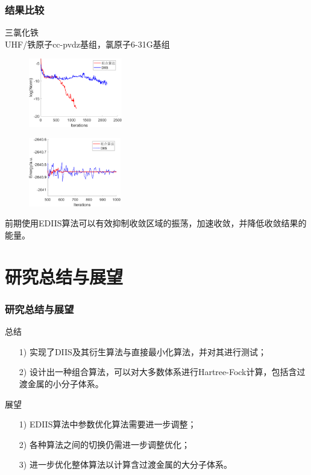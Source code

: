 \documentclass[10pt,aspectratio=43,mathserif,UTF8]{beamer}
\begin{document}
\begin{frame}
	\frametitle{结果比较}
	三氯化铁\\
	UHF/铁原子cc-pvdz基组，氯原子6-31G基组

	\begin{figure}[ht!]
		\centering
		\begin{minipage}{0.4\linewidth}
			\centering
			\includegraphics[height=3cm]{figure/FeCl3/NORM2.png}
			\label{fig:FeCl3:E}
		\end{minipage}
		\begin{minipage}{0.4\linewidth}
			\centering
			\includegraphics[height=3cm]{figure/FeCl3/FD6.png}
			\label{fig:FeCl3:FD}
		\end{minipage}
	\end{figure}
	前期使用EDIIS算法可以有效抑制收敛区域的振荡，加速收敛，并降低收敛结果的能量。
\end{frame}

\section{研究总结与展望}

\begin{frame}
	\frametitle{研究总结与展望}
	总结
	\begin{itemize}
		\item[1)]
		 实现了DIIS及其衍生算法与直接最小化算法，并对其进行测试；
		\item[2)] 
		 设计出一种组合算法，可以对大多数体系进行Hartree-Fock计算，包括含过渡金属的小分子体系。
	\end{itemize}
	
	展望
	\begin{itemize}
		\item [1)]
		EDIIS算法中参数优化算法需要进一步调整；
		\item [2)]
		各种算法之间的切换仍需进一步调整优化；
		\item [3)]
		进一步优化整体算法以计算含过渡金属的大分子体系。
	\end{itemize}
\end{frame}
\end{document}
